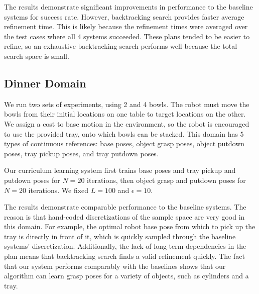 The results demonstrate significant improvements in performance to the baseline systems for success rate.
However, backtracking search provides faster average refinement time. This is likely because the
refinement times were averaged over the test cases where all 4 systems succeeded. These plans tended
to be easier to refine, so an exhaustive backtracking search performs well because the total search space is small.

\subsection{Dinner Domain}
We run two sets of experiments, using 2 and 4 bowls. The robot must move the
bowls from their initial locations on one table to target locations on the other. We assign a cost to
base motion in the environment, so the robot is encouraged to use the provided tray, onto which bowls can be stacked.
This domain has 5 types of continuous references: base poses, object grasp poses, object putdown poses, tray pickup
poses, and tray putdown poses.

Our curriculum learning system first trains base poses and tray pickup and putdown poses for
$N = 20$ iterations, then object grasp and putdown poses for $N = 20$ iterations. We fixed $L = 100$ and $\epsilon = 10$.

The results demonstrate comparable performance to the baseline systems. The reason is that
hand-coded discretizations of the sample space are very good in this domain. For example, the optimal
robot base pose from which to pick up the tray is directly in front of it, which is quickly sampled through
the baseline systems' discretization. Additionally, the lack of long-term dependencies in the plan
means that backtracking search finds a valid refinement quickly. The fact that our system performs comparably
with the baselines shows that our algorithm can learn grasp poses for a variety of objects, such as cylinders
and a tray.